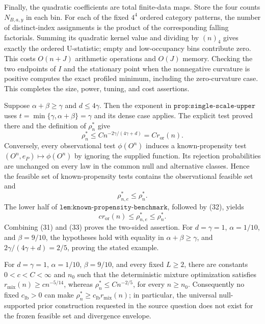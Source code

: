 Finally, the quadratic coefficients are total finite-data maps. Store the four counts \(N_{B,a,y}\) in each bin. For each of the fixed \(4^4\) ordered category patterns, the number of distinct-index assignments is the product of the corresponding falling factorials. Summing its quadratic kernel value and dividing by \((n)_4\) gives exactly the ordered U-statistic; empty and low-occupancy bins contribute zero. This costs \(O(n+J)\) arithmetic operations and \(O(J)\) memory. Checking the two endpoints of \(I\) and the stationary point when the nonnegative curvature is positive computes the exact profiled minimum, including the zero-curvature case. This completes the size, power, tuning, and cost assertions.

Suppose \(\alpha+\beta\ge\gamma\) and \(d\le4\gamma\). Then the exponent in \(\texttt{prop:single-scale-upper}\) uses \(t=\min\{\gamma,\alpha+\beta\}=\gamma\) and its dense case applies. The explicit test proved there and the definition of \(\rho_n^*\) give
\[
 \rho_n^*\le C n^{-2\gamma/(4\gamma+d)}=C r_{\mathrm{or}}(n).        \tag{31}
\]
Conversely, every observational test \(\phi(O^n)\) induces a known-propensity test \((O^n,e_P)\mapsto\phi(O^n)\) by ignoring the supplied function. Its rejection probabilities are unchanged on every law in the common null and alternative classes. Hence the feasible set of known-propensity tests contains the observational feasible set and
\[
 \rho_{n,e}^*\le\rho_n^*.                                           \tag{32}
\]
The lower half of \(\texttt{lem:known-propensity-benchmark}\), followed by (32), yields
\[
 c r_{\mathrm{or}}(n)\le\rho_{n,e}^*\le\rho_n^*.                    \tag{33}
\]
Combining (31) and (33) proves the two-sided assertion. For \(d=\gamma=1\), \(\alpha=1/10\), and \(\beta=9/10\), the hypotheses hold with equality in \(\alpha+\beta\ge\gamma\), and \(2\gamma/(4\gamma+d)=2/5\), proving the stated example.

For \(d=\gamma=1\), \(\alpha=1/10\), \(\beta=9/10\), and every fixed \(L\ge2\), there are constants \(0<c<C<\infty\) and \(n_0\) such that the deterministic mixture optimization satisfies \(r_{\mathrm{mix}}(n)\ge c n^{-5/14}\), whereas \(\rho_n^*\le Cn^{-2/5}\), for every \(n\ge n_0\). Consequently no fixed \(c_{\mathrm{lb}}>0\) can make \(\rho_n^*\ge c_{\mathrm{lb}}r_{\mathrm{mix}}(n)\); in particular, the universal null-supported prior construction requested in the source question does not exist for the frozen feasible set and divergence envelope.


